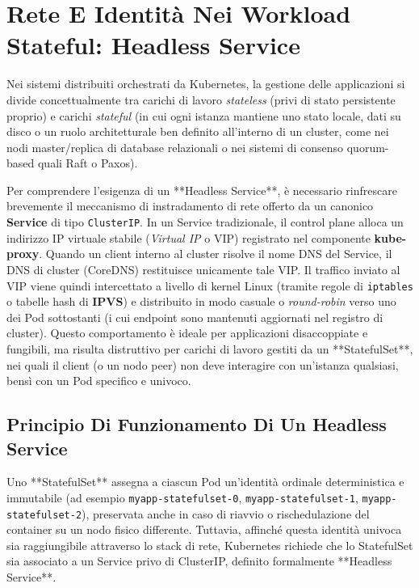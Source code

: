 \documentclass[11pt, a4paper]{article}
\begin{document}
\section{Rete E Identità Nei Workload Stateful: Headless Service}

Nei sistemi distribuiti orchestrati da Kubernetes, la gestione delle applicazioni si divide concettualmente tra carichi di lavoro \emph{stateless} (privi di stato persistente proprio) e carichi \emph{stateful} (in cui ogni istanza mantiene uno stato locale, dati su disco o un ruolo architetturale ben definito all'interno di un cluster, come nei nodi master/replica di database relazionali o nei sistemi di consenso quorum-based quali Raft o Paxos).

Per comprendere l'esigenza di un **Headless Service**, è necessario rinfrescare brevemente il meccanismo di instradamento di rete offerto da un canonico \textbf{Service} di tipo \texttt{ClusterIP}. In un Service tradizionale, il control plane alloca un indirizzo IP virtuale stabile (\emph{Virtual IP} o VIP) registrato nel componente \textbf{kube-proxy}. Quando un client interno al cluster risolve il nome DNS del Service, il DNS di cluster (CoreDNS) restituisce unicamente tale VIP. Il traffico inviato al VIP viene quindi intercettato a livello di kernel Linux (tramite regole di \texttt{iptables} o tabelle hash di \textbf{IPVS}) e distribuito in modo casuale o \emph{round-robin} verso uno dei Pod sottostanti (i cui endpoint sono mantenuti aggiornati nel registro di cluster). Questo comportamento è ideale per applicazioni disaccoppiate e fungibili, ma risulta distruttivo per carichi di lavoro gestiti da un **StatefulSet**, nei quali il client (o un nodo peer) non deve interagire con un'istanza qualsiasi, bensì con un Pod specifico e univoco.

\subsection{Principio Di Funzionamento Di Un Headless Service}

Uno **StatefulSet** assegna a ciascun Pod un'identità ordinale deterministica e immutabile (ad esempio \texttt{myapp-statefulset-0}, \texttt{myapp-statefulset-1}, \texttt{myapp-statefulset-2}), preservata anche in caso di riavvio o rischedulazione del container su un nodo fisico differente. Tuttavia, affinché questa identità univoca sia raggiungibile attraverso lo stack di rete, Kubernetes richiede che lo StatefulSet sia associato a un Service privo di ClusterIP, definito formalmente **Headless Service**.
\end{document}
